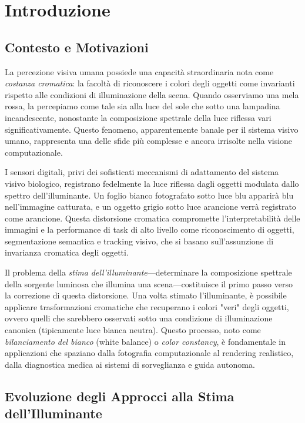 \chapter{Introduzione}\label{chap:introduction} %

\section{Contesto e Motivazioni}

La percezione visiva umana possiede una capacità straordinaria nota come \emph{costanza cromatica}: la facoltà di riconoscere i colori degli oggetti come invarianti rispetto alle condizioni di illuminazione della scena. Quando osserviamo una mela rossa, la percepiamo come tale sia alla luce del sole che sotto una lampadina incandescente, nonostante la composizione spettrale della luce riflessa vari significativamente. Questo fenomeno, apparentemente banale per il sistema visivo umano, rappresenta una delle sfide più complesse e ancora irrisolte nella visione computazionale.

I sensori digitali, privi dei sofisticati meccanismi di adattamento del sistema visivo biologico, registrano fedelmente la luce riflessa dagli oggetti modulata dallo spettro dell'illuminante. Un foglio bianco fotografato sotto luce blu apparirà blu nell'immagine catturata, e un oggetto grigio sotto luce arancione verrà registrato come arancione. Questa distorsione cromatica compromette l'interpretabilità delle immagini e la performance di task di alto livello come riconoscimento di oggetti, segmentazione semantica e tracking visivo, che si basano sull'assunzione di invarianza cromatica degli oggetti.

Il problema della \emph{stima dell'illuminante}---determinare la composizione spettrale della sorgente luminosa che illumina una scena---costituisce il primo passo verso la correzione di questa distorsione. Una volta stimato l'illuminante, è possibile applicare trasformazioni cromatiche che recuperano i colori "veri" degli oggetti, ovvero quelli che sarebbero osservati sotto una condizione di illuminazione canonica (tipicamente luce bianca neutra). Questo processo, noto come \emph{bilanciamento del bianco} (white balance) o \emph{color constancy}, è fondamentale in applicazioni che spaziano dalla fotografia computazionale al rendering realistico, dalla diagnostica medica ai sistemi di sorveglianza e guida autonoma.

\section{Evoluzione degli Approcci alla Stima dell'Illuminante}

